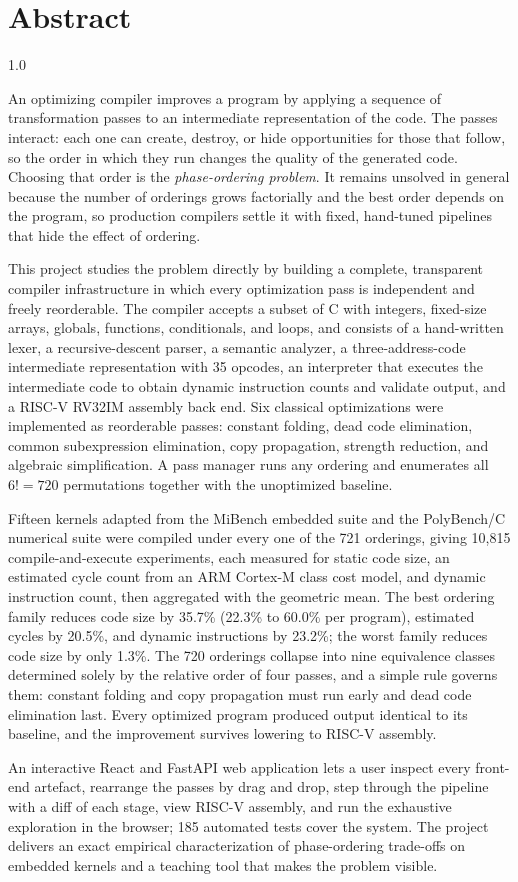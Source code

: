 \chapter*{Abstract}
\begin{spacing}{1.0}

An optimizing compiler improves a program by applying a sequence of transformation passes to an intermediate representation of the code. The passes interact: each one can create, destroy, or hide opportunities for those that follow, so the order in which they run changes the quality of the generated code. Choosing that order is the \emph{phase-ordering problem}. It remains unsolved in general because the number of orderings grows factorially and the best order depends on the program, so production compilers settle it with fixed, hand-tuned pipelines that hide the effect of ordering.

This project studies the problem directly by building a complete, transparent compiler infrastructure in which every optimization pass is independent and freely reorderable. The compiler accepts a subset of C with integers, fixed-size arrays, globals, functions, conditionals, and loops, and consists of a hand-written lexer, a recursive-descent parser, a semantic analyzer, a three-address-code intermediate representation with 35 opcodes, an interpreter that executes the intermediate code to obtain dynamic instruction counts and validate output, and a RISC-V RV32IM assembly back end. Six classical optimizations were implemented as reorderable passes: constant folding, dead code elimination, common subexpression elimination, copy propagation, strength reduction, and algebraic simplification. A pass manager runs any ordering and enumerates all $6! = 720$ permutations together with the unoptimized baseline.

Fifteen kernels adapted from the MiBench embedded suite and the PolyBench/C numerical suite were compiled under every one of the 721 orderings, giving 10{,}815 compile-and-execute experiments, each measured for static code size, an estimated cycle count from an ARM Cortex-M class cost model, and dynamic instruction count, then aggregated with the geometric mean. The best ordering family reduces code size by 35.7\% (22.3\% to 60.0\% per program), estimated cycles by 20.5\%, and dynamic instructions by 23.2\%; the worst family reduces code size by only 1.3\%. The 720 orderings collapse into nine equivalence classes determined solely by the relative order of four passes, and a simple rule governs them: constant folding and copy propagation must run early and dead code elimination last. Every optimized program produced output identical to its baseline, and the improvement survives lowering to RISC-V assembly.

An interactive React and FastAPI web application lets a user inspect every front-end artefact, rearrange the passes by drag and drop, step through the pipeline with a diff of each stage, view RISC-V assembly, and run the exhaustive exploration in the browser; 185 automated tests cover the system. The project delivers an exact empirical characterization of phase-ordering trade-offs on embedded kernels and a teaching tool that makes the problem visible.
\end{spacing}
